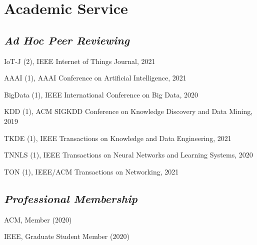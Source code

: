
\vspace{-8pt}
\section*{Academic Service}
\vspace{-4pt}


\subsection*{\textnormal{\textit{Ad Hoc Peer Reviewing}}}
\vspace{-4pt}
\indent

IoT-J (2), IEEE Internet of Things Journal, 2021

AAAI (1), AAAI Conference on Artificial Intelligence, 2021

BigData (1), IEEE International Conference on Big Data, 2020

KDD (1), ACM SIGKDD Conference on Knowledge Discovery and Data Mining, 2019

TKDE (1), IEEE Transactions on Knowledge and Data Engineering, 2021

TNNLS (1), IEEE Transactions on Neural Networks and Learning Systems, 2020

TON (1), IEEE/ACM Transactions on Networking, 2021

\subsection*{\textnormal{\textit{Professional Membership}}}
\vspace{-4pt}
\indent 

ACM, Member (2020)

IEEE, Graduate Student Member (2020)